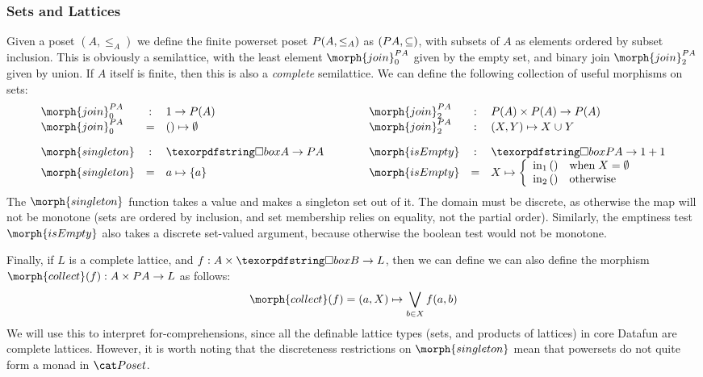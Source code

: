 \subsubsection{Sets and Lattices} Given a poset $(A, \leq_A)$ we
define the finite powerset poset $P (A, \leq_A)$ as
$(P A, \subseteq)$, with subsets of $A$ as elements ordered by
subset inclusion. This is obviously a semilattice, with the least
element $\morph{join}^{\pfinof A}_0$ given by the empty set, and binary join
$\morph{join}^{\pfinof A}_2$ given by union. If $A$ itself is finite, then this is
also a \emph{complete} semilattice.  We can define the following
collection of useful morphisms on sets:
\begin{displaymath}
  \begin{array}{lclclcl}
    \morph{join}^{\pfinof A}_0& : & 1 \to \pfinof(A) & \qquad & \morph{join}^{\pfinof A}_2 & : & \pfinof(A) \times \pfinof(A) \to \pfinof(A) \\
    \morph{join}^{\pfinof A}_0& = & \etuple{} \mapsto \emptyset  &  & \morph{join}^{\pfinof A}_2 & : & \etuple{X, Y} \mapsto X \cup Y \\[1em]
    \morph{singleton} & : & \iso A \to \pfinof{A} & & \morph{isEmpty} & : & \iso \pfinof{A} \to 1 + 1 \\
    \morph{singleton} & = & a \mapsto \esetraw{a}
    & &
    \morph{isEmpty} & = & X \mapsto \left\{ \begin{array}{ll}
                                              \inj 1 {\etuple{}} & \mbox{when}\;X = \emptyset \\
                                              \inj 2 {\etuple{}} & \mbox{otherwise}
                                            \end{array}
                                    \right.
  \end{array}
\end{displaymath}
The $\morph{singleton}$ function takes a value and makes a singleton set out of it. The
domain must be discrete, as otherwise the map will not be monotone (sets are ordered by
inclusion, and set membership relies on equality, not the partial order). Similarly,
the emptiness test $\morph{isEmpty}$ also takes a discrete set-valued argument, because
otherwise the boolean test would not be monotone.

Finally, if $L$ is a complete lattice, and $f : A \times \iso B \to L$, then we can define
we can also define the morphism $\morph{collect}(f) : A \times \pfinof{A} \to L$ as follows:
\begin{displaymath}
 \morph{collect}(f)  = (a, X) \mapsto \bigvee_{b \in X} f(a, b)
\end{displaymath}
We will use this to interpret for-comprehensions, since all the definable lattice
types (sets, and products of lattices) in core Datafun are complete lattices. However,
it is worth noting that the discreteness restrictions on $\morph{singleton}$ mean that
powersets do not quite form a monad in $\Poset$.

